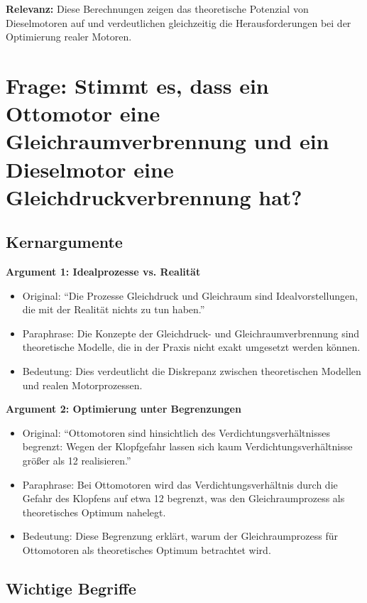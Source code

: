 \documentclass[a4paper,12pt]{article}
\begin{document}
\textbf{Relevanz:} Diese Berechnungen zeigen das theoretische Potenzial von Dieselmotoren auf und verdeutlichen gleichzeitig die Herausforderungen bei der Optimierung realer Motoren.


\section{Frage: Stimmt es, dass ein Ottomotor eine Gleichraumverbrennung und ein Dieselmotor eine Gleichdruckverbrennung hat?}

\subsection{Kernargumente}

\textbf{Argument 1: Idealprozesse vs. Realität}

\begin{itemize}
    \item Original: \enquote{Die Prozesse Gleichdruck und Gleichraum sind Idealvorstellungen, die mit der Realität nichts zu tun haben.}
    \item Paraphrase: Die Konzepte der Gleichdruck- und Gleichraumverbrennung sind theoretische Modelle, die in der Praxis nicht exakt umgesetzt werden können.
    \item Bedeutung: Dies verdeutlicht die Diskrepanz zwischen theoretischen Modellen und realen Motorprozessen.
\end{itemize}

\textbf{Argument 2: Optimierung unter Begrenzungen}

\begin{itemize}
    \item Original: \enquote{Ottomotoren sind hinsichtlich des Verdichtungsverhältnisses begrenzt: Wegen der Klopfgefahr lassen sich kaum Verdichtungsverhältnisse größer als 12 realisieren.}
    \item Paraphrase: Bei Ottomotoren wird das Verdichtungsverhältnis durch die Gefahr des Klopfens auf etwa 12 begrenzt, was den Gleichraumprozess als theoretisches Optimum nahelegt.
    \item Bedeutung: Diese Begrenzung erklärt, warum der Gleichraumprozess für Ottomotoren als theoretisches Optimum betrachtet wird.
\end{itemize}

\subsection{Wichtige Begriffe}
\end{document}

